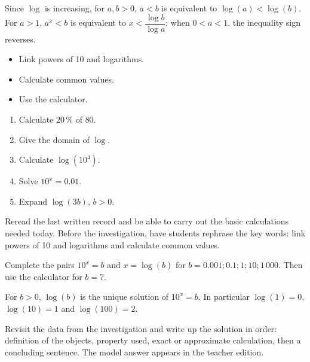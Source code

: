 Since $\log$ is increasing, for $a,b>0$, $a<b$ is equivalent to $\log(a)<\log(b)$. For $a>1$, $a^x<b$ is equivalent to $x<\dfrac{\log b}{\log a}$; when $0<a<1$, the inequality sign reverses.

\begin{objectifs}\begin{itemize}\item Link powers of 10 and logarithms.\item Calculate common values.\item Use the calculator.\end{itemize}\end{objectifs}
\begin{automatismes}\begin{enumerate}\item Calculate $20\,\%$ of $80$. \item Give the domain of $\log$. \rep{$]0,+\infty[$}\item Calculate $\log(10^4)$. \item Solve $10^x=0.01$. \item Expand $\log(3b)$, $b>0$. \end{enumerate}\end{automatismes}
\begin{prerequis}Reread the last written record and be able to carry out the basic calculations needed today. Before the investigation, have students rephrase the key words: link powers of 10 and logarithms and calculate common values.\end{prerequis}

\begin{activite}
Complete the pairs $10^x=b$ and $x=\log(b)$ for $b=0.001;0.1;1;10;1\,000$. Then use the calculator for $b=7$.

\end{activite}

\begin{traceecrite}For $b>0$, $\log(b)$ is the unique solution of $10^x=b$. In particular $\log(1)=0$, $\log(10)=1$ and $\log(100)=2$.\end{traceecrite}

\begin{exemple}
Revisit the data from the investigation and write up the solution in order: definition of the objects, property used, exact or approximate calculation, then a concluding sentence. The model answer appears in the teacher edition.
\end{exemple}

